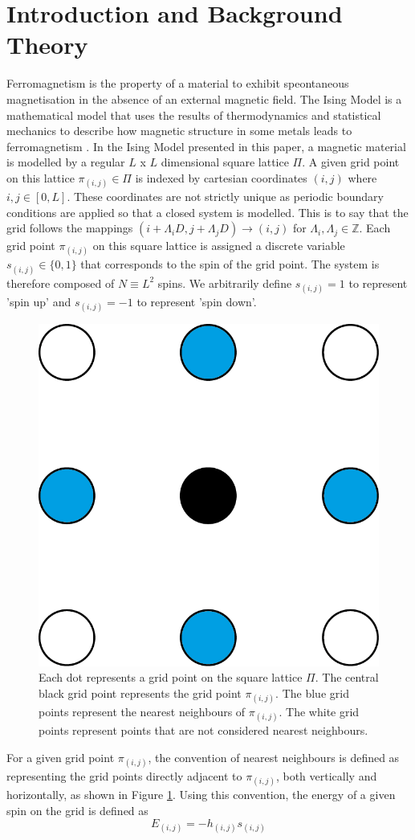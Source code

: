\documentclass[11pt]{iopart}
\begin{document}
\section{Introduction and Background Theory}
Ferromagnetism is the property of a material to exhibit speontaneous magnetisation in the absence of an external magnetic field. The Ising Model is a mathematical model that uses the results of thermodynamics and statistical mechanics to describe how magnetic structure in some metals leads to ferromagnetism \cite{handout}. In the Ising Model presented in this paper, a magnetic material is modelled by a regular $L$ x $L$ dimensional square lattice $\Pi$. A given grid point on this lattice $\pi_{(i,j)} \in \Pi$ is indexed by cartesian coordinates $(i, j)$ where $i, j \in [0, L]$. These coordinates are not strictly unique as periodic boundary conditions are applied so that a closed system is modelled. This is to say that the grid follows the mappings $(i + \Lambda_i D, j + \Lambda_j D) \to (i, j)$ for $\Lambda_i, \Lambda_j \in \mathbb{Z}$. Each grid point $\pi_{(i, j)}$ on this square lattice is assigned a discrete variable  $s_{(i, j)} \in \{0, 1\}$ that corresponds to the spin of the grid point. The system is therefore composed of $N \equiv L^2$ spins. We arbitrarily define $s_{(i, j)} = 1$ to represent 'spin up' and $s_{(i,j)} = -1$ to represent 'spin down'.
\begin{figure}[b]
  \centering
  \includegraphics[width=0.10\linewidth]{images/nearestneighbour/4x/nearestneighbour@4x.png}
  \caption{Each dot represents a grid point on the square lattice $\Pi$. The central black grid point represents the grid point $\pi_{(i, j)}$. The blue grid points represent the nearest neighbours of $\pi_{(i, j)}$. The white grid points represent points that are not considered nearest neighbours.}
  \label{fig:nearestneighbours}
\end{figure}
For a given grid point $\pi_{(i, j)}$, the convention of nearest neighbours is defined as representing the grid points directly adjacent to $\pi_{(i,j)}$, both vertically and horizontally, as shown in Figure \ref{fig:nearestneighbours}. Using this convention, the energy of a given spin on the grid is defined as \cite{handout}
\begin{equation}
E_{(i, j)} = -h_{(i, j)} s_{(i, j)}
\end{equation}
\end{document}
